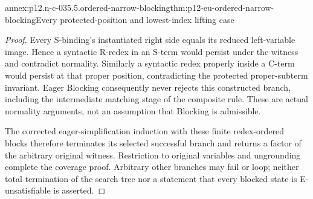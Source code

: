 \begin{annexitem}{annex:p12.n-c-035.5.ordered-narrow-blocking}{thm:p12-eu-ordered-narrow-blocking}{Every protected-position and lowest-index lifting case}
\begin{proof}
Every S-binding's instantiated right side equals its reduced
left-variable image. Hence a syntactic R-redex in an S-term
would persist under the witness and contradict normality.
Similarly a syntactic redex properly inside a C-term would
persist at that proper position, contradicting the protected
proper-subterm invariant. Eager Blocking consequently never
rejects this constructed branch, including the intermediate
matching stage of the composite rule. These are actual normality
arguments, not an assumption that Blocking is admissible.

The corrected eager-simplification induction with these finite
redex-ordered blocks therefore terminates its selected successful
branch and returns a factor of the arbitrary original witness.
Restriction to original variables and ungrounding complete the
coverage proof. Arbitrary other branches may fail or loop; neither
total termination of the search tree nor a statement that every
blocked state is E-unsatisfiable is asserted.
\end{proof}
\end{annexitem}

